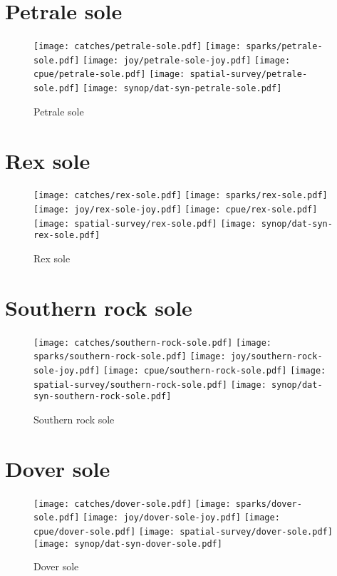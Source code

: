 \section*{Petrale sole}

\begin{figure}[htbp]
\centering
\texttt{[image: catches/petrale-sole.pdf]}
\texttt{[image: sparks/petrale-sole.pdf]}
\texttt{[image: joy/petrale-sole-joy.pdf]}
\texttt{[image: cpue/petrale-sole.pdf]}
\texttt{[image: spatial-survey/petrale-sole.pdf]}
\texttt{[image: synop/dat-syn-petrale-sole.pdf]}
\caption{Petrale sole}
\end{figure}
\clearpage
\section*{Rex sole}

\begin{figure}[htbp]
\centering
\texttt{[image: catches/rex-sole.pdf]}
\texttt{[image: sparks/rex-sole.pdf]}
\texttt{[image: joy/rex-sole-joy.pdf]}
\texttt{[image: cpue/rex-sole.pdf]}
\texttt{[image: spatial-survey/rex-sole.pdf]}
\texttt{[image: synop/dat-syn-rex-sole.pdf]}
\caption{Rex sole}
\end{figure}
\clearpage
\section*{Southern rock sole}

\begin{figure}[htbp]
\centering
\texttt{[image: catches/southern-rock-sole.pdf]}
\texttt{[image: sparks/southern-rock-sole.pdf]}
\texttt{[image: joy/southern-rock-sole-joy.pdf]}
\texttt{[image: cpue/southern-rock-sole.pdf]}
\texttt{[image: spatial-survey/southern-rock-sole.pdf]}
\texttt{[image: synop/dat-syn-southern-rock-sole.pdf]}
\caption{Southern rock sole}
\end{figure}
\clearpage
\section*{Dover sole}

\begin{figure}[htbp]
\centering
\texttt{[image: catches/dover-sole.pdf]}
\texttt{[image: sparks/dover-sole.pdf]}
\texttt{[image: joy/dover-sole-joy.pdf]}
\texttt{[image: cpue/dover-sole.pdf]}
\texttt{[image: spatial-survey/dover-sole.pdf]}
\texttt{[image: synop/dat-syn-dover-sole.pdf]}
\caption{Dover sole}
\end{figure}
\clearpage
